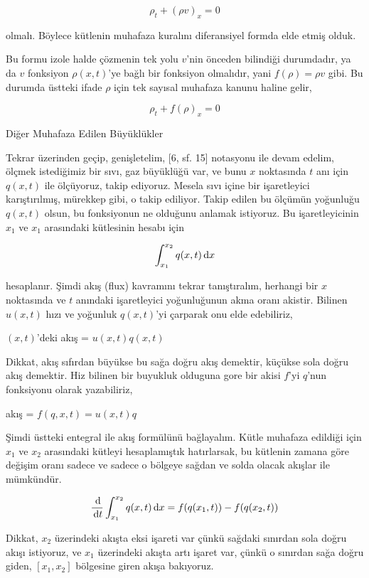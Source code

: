 \documentclass[12pt,fleqn]{article}\usepackage{../../common}
\begin{document}
$$
\rho_t + (\rho v)_x = 0
$$

olmalı. Böylece kütlenin muhafaza kuralını diferansiyel formda elde etmiş olduk.

Bu formu izole halde çözmenin tek yolu $v$'nin önceden bilindiği durumdadır, ya
da $v$ fonksiyon $\rho(x,t)$'ye bağlı bir fonksiyon olmalıdır, yani
$f(\rho) = \rho v$ gibi. Bu durumda üstteki ifade $\rho$ için tek sayısal
muhafaza kanunu haline gelir,

$$
\rho_t + f(\rho)_x = 0
$$

Diğer Muhafaza Edilen Büyüklükler

Tekrar üzerinden geçip, genişletelim, [6, sf. 15] notasyonu ile devam edelim,
ölçmek istediğimiz bir sıvı, gaz büyüklüğü var, ve bunu $x$ noktasında $t$ anı
için $q(x,t)$ ile ölçüyoruz, takip ediyoruz. Mesela sıvı içine bir işaretleyici
karıştırılmış, mürekkep gibi, o takip ediliyor. Takip edilen bu ölçümün
yoğunluğu $q(x,t)$ olsun, bu fonksiyonun ne olduğunu anlamak istiyoruz. Bu
işaretleyicinin $x_1$ ve $x_1$ arasındaki kütlesinin hesabı için

$$
\int _{x_1}^{x_2} q(x,t) \,\mathrm{d} x
$$

hesaplanır. Şimdi akış (flux) kavramını tekrar tanıştıralım, herhangi bir $x$
noktasında ve $t$ anındaki işaretleyici yoğunluğunun akma oranı akistir.
Bilinen $u(x,t)$ hızı ve yoğunluk $q(x,t)$'yi çarparak onu elde edebiliriz,

$(x,t)$'deki akış  = $u(x,t) q(x,t)$

Dikkat, akış sıfırdan büyükse bu sağa doğru akış demektir, küçükse sola doğru
akış demektir. Hiz bilinen bir buyukluk olduguna gore bir akisi $f$'yi $q$'nun
fonksiyonu olarak yazabiliriz,

akış = $f(q,x,t) = u(x,t) q$ 

Şimdi üstteki entegral ile akış formülünü bağlayalım. Kütle muhafaza edildiği
için $x_1$ ve $x_2$ arasındaki kütleyi hesaplamıştık hatırlarsak, bu kütlenin
zamana göre değişim oranı sadece ve sadece o bölgeye sağdan ve solda olacak
akışlar ile mümkündür.

$$
\frac{\,\mathrm{d}}{\,\mathrm{d} t} \int _{x_1}^{x_2} q(x,t) \,\mathrm{d} x =
f(q(x_1,t)) - f(q(x_2,t)) 
$$

Dikkat, $x_2$ üzerindeki akışta eksi işareti var çünkü sağdaki sınırdan
sola doğru akışı istiyoruz, ve $x_1$ üzerindeki akışta artı işaret var,
çünkü o sınırdan sağa doğru giden, $[x_1,x_2]$ bölgesine giren akışa
bakıyoruz.
\end{document}
